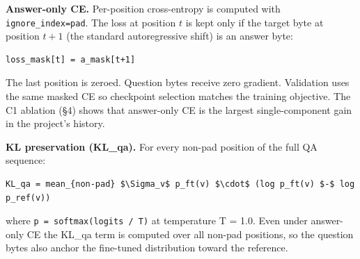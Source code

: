 \documentclass[11pt]{article}
\begin{document}
\textbf{Answer-only CE.} Per-position cross-entropy is computed with \texttt{ignore\_index=pad}. The loss at position $t$ is kept only if the target byte at position $t+1$ (the standard autoregressive shift) is an answer byte:

\begin{lstlisting}
loss_mask[t] = a_mask[t+1]
\end{lstlisting}

The last position is zeroed. Question bytes receive zero gradient. Validation uses the same masked CE so checkpoint selection matches the training objective. The C1 ablation (\S4) shows that answer-only CE is the largest single-component gain in the project's history.

\textbf{KL preservation (KL\_qa).} For every non-pad position of the full QA sequence:

\begin{lstlisting}
KL_qa = mean_{non-pad} $\Sigma_v$ p_ft(v) $\cdot$ (log p_ft(v) $-$ log p_ref(v))
\end{lstlisting}

where \texttt{p = softmax(logits / T)} at temperature T = 1.0. Even under answer-only CE the KL\_qa term is computed over all non-pad positions, so the question bytes also anchor the fine-tuned distribution toward the reference.
\end{document}
